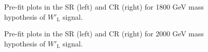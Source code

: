 \begin{figure}[H]
  \centering
  \caption{Pre-fit plots in the SR (left) and CR (right) for 1800 GeV mass hypothesis of $W'_{\text{L}}$ signal.}
  \label{fig:Prefit_WpLH1800_Asimov}
\end{figure}
\begin{figure}[H]
  \centering
  \caption{Pre-fit plots in the SR (left) and CR (right) for 2000 GeV mass hypothesis of $W'_{\text{L}}$ signal.}
  \label{fig:Prefit_WpLH2000_Asimov}
\end{figure}

